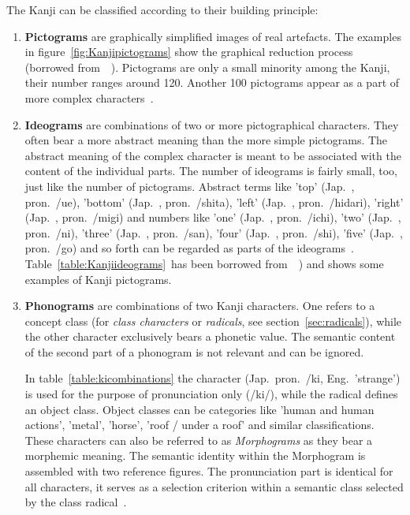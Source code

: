 The Kanji can be classified according to their building principle:
\begin{enumerate}
 \item \textbf{Pictograms} are graphically simplified images of real artefacts.
       The examples in figure~\ref{fig:Kanjipictograms} 
       show the graphical reduction process (borrowed 
       from~~\citeyear{Kano1990}).
       Pictograms are only a small minority among the Kanji,
       their number ranges around 120. Another 100 pictograms appear as a part of
       more complex characters~.
       
 \item \textbf{Ideograms} are combinations of two or more pictographical
       characters. They often bear a more abstract meaning than the more simple 
       pictograms. The abstract meaning of the complex character is meant to be 
       associated with the content of the individual parts. The number of 
       ideograms is fairly small, too,
       just like the number of pictograms. Abstract terms like 
       'top' (Jap.\ , pron.\ /ue), 
       'bottom' (Jap.\ , pron.\ /shita),
       'left' (Jap.\ , pron.\ /hidari),
       'right' (Jap.\ , pron.\ /migi)
       and numbers like
       'one' (Jap.\ , pron.\ /ichi),
       'two' (Jap.\ , pron.\ /ni),
       'three' (Jap.\ , pron.\ /san),
       'four' (Jap.\ , pron.\ /shi),
       'five' (Jap.\ , pron.\ /go)
       and so forth can be regarded as parts of the 
       ideograms~.
       Table~\ref{table:Kanjiideograms}\ has been borrowed 
       from~~\citeyear{Kano1990}) and shows  
       some examples of Kanji pictograms.

 \item \textbf{Phonograms} are combinations of two Kanji characters. One
       refers to a concept class (for \emph{class characters} or \emph{radicals},
       see section~\ref{sec:radicals}), 
       while the other character exclusively bears a phonetic value. The 
       semantic content of the second part of a phonogram is not relevant 
       and can be ignored.

       In table~\ref{table:kicombinations} the character 
        (Jap.\ pron.\ /ki, Eng.\ 'strange') is used for the purpose
       of pronunciation only (/ki/), while the radical defines an
       object class. Object classes can be categories like 'human and human 
       actions', 'metal', 'horse', 'roof / under a roof' and similar 
       classifications. These characters can also be referred to as 
       \emph{Morphograms} as they bear a morphemic meaning.
       The semantic identity within the Morphogram is assembled with two
       reference figures. The pronunciation part is identical for all characters,
       it serves as a selection criterion within a semantic class selected by 
       the class radical~.

\end{enumerate}

